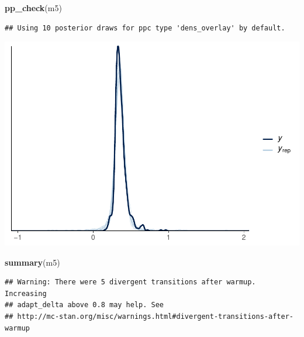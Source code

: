 \documentclass[
]{article}
\newenvironment{Shaded}{\begin{snugshade}}{\end{snugshade}}
\newcommand{\FunctionTok}[1]{\textcolor[rgb]{0.13,0.29,0.53}{\textbf{#1}}}
\newcommand{\NormalTok}[1]{#1}
\begin{document}
\begin{Shaded}
\begin{Highlighting}[]
\FunctionTok{pp\_check}\NormalTok{(m5)}
\end{Highlighting}
\end{Shaded}

\begin{verbatim}
## Using 10 posterior draws for ppc type 'dens_overlay' by default.
\end{verbatim}

\includegraphics{params_analyses_files/figure-latex/unnamed-chunk-6-2.pdf}

\begin{Shaded}
\begin{Highlighting}[]
\FunctionTok{summary}\NormalTok{(m5)}
\end{Highlighting}
\end{Shaded}

\begin{verbatim}
## Warning: There were 5 divergent transitions after warmup. Increasing
## adapt_delta above 0.8 may help. See
## http://mc-stan.org/misc/warnings.html#divergent-transitions-after-warmup
\end{verbatim}
\end{document}
